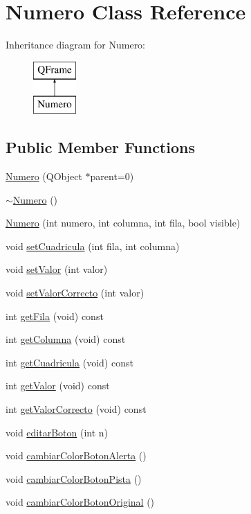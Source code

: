 \hypertarget{class_numero}{\section{Numero Class Reference}
\label{class_numero}
}
Inheritance diagram for Numero\-:\begin{figure}[H]
\begin{center}
\leavevmode
\includegraphics[height=2.000000cm]{class_numero}
\end{center}
\end{figure}
\subsection*{Public Member Functions}
\begin{DoxyCompactItemize}
\item 
\hyperlink{class_numero_a1393437877ace236d969c6dc44ae7ed4}{Numero} (Q\-Object $\ast$parent=0)
\item 
\hyperlink{class_numero_a8fc2a5249f519a321b0bffa993d3f05c}{$\sim$\-Numero} ()
\item 
\hyperlink{class_numero_a390143320c62c9ec5f89d767b8c2ef33}{Numero} (int numero, int columna, int fila, bool visible)
\item 
void \hyperlink{class_numero_a582df3fe258d20235163d0fbcec712a8}{set\-Cuadricula} (int fila, int columna)
\item 
void \hyperlink{class_numero_a836200e8bd04882bc7ea2f5bc5d7beef}{set\-Valor} (int valor)
\item 
void \hyperlink{class_numero_ae9002d90ee6ccd3120077c304b85f4fd}{set\-Valor\-Correcto} (int valor)
\item 
int \hyperlink{class_numero_a611e944da6a63813e305287c3f90ad76}{get\-Fila} (void) const 
\item 
int \hyperlink{class_numero_a4420f97d86be1c1a173405ea37423449}{get\-Columna} (void) const 
\item 
int \hyperlink{class_numero_ac80a32905356e20d893807572f8b8d4a}{get\-Cuadricula} (void) const 
\item 
int \hyperlink{class_numero_ab744d258e626684a3106d39c9cf630b7}{get\-Valor} (void) const 
\item 
int \hyperlink{class_numero_a850682763636579e94c90579f74d1308}{get\-Valor\-Correcto} (void) const 
\item 
void \hyperlink{class_numero_a318e925fff822ed78cd39e382543620c}{editar\-Boton} (int n)
\item 
void \hyperlink{class_numero_a8a2040801509a6563189dac2a6618372}{cambiar\-Color\-Boton\-Alerta} ()
\item 
void \hyperlink{class_numero_a1492e35dd63ed7c2a0b6505f755fbf28}{cambiar\-Color\-Boton\-Pista} ()
\item 
void \hyperlink{class_numero_a8508989f8472de04dd6a4509d1e15814}{cambiar\-Color\-Boton\-Original} ()
\end{DoxyCompactItemize}
